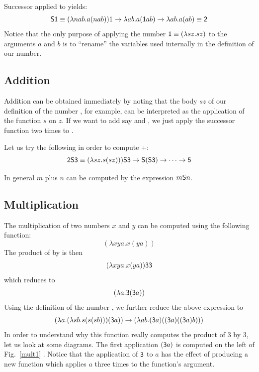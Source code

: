 \documentclass[12pt]{article}
\begin{document}
Successor applied to {} yields:
$${\sf S}{\sf 1}\equiv (\lambda nab.a(nab)){\sf 1} \rightarrow \lambda ab.a ({\sf 1}ab) \rightarrow \lambda ab.a(ab)\equiv {\sf 2}$$
Notice that the only purpose of applying the number ${\sf 1}\equiv(\lambda sz.sz)$ to the arguments $a$ and $b$ is to ``rename'' the variables used internally in the definition of our number.

\subsection{Addition}
Addition can be obtained immediately by noting that the body $sz$ of our definition of the number {}, for example, can be interpreted as the application of the function $s$ on $z$. If we want to add say {} and {}, we just apply the successor function two times to {}. 

Let us try the following in order to compute {}+{}:
$${\sf 2}{\sf S}{\sf 3}\equiv (\lambda sz.s(sz))){\sf S}{\sf 3}\rightarrow {\sf S}({\sf S}{\sf 3})\rightarrow \cdots \rightarrow {\sf 5}$$

In general $m$ plus $n$ can be computed by the expression $m{\sf S}n$.


\subsection{Multiplication}
The multiplication of two numbers $x$ and $y$ can be computed using the following function:
$$(\lambda xya.x(ya))$$ The product of {} by {} is then
$$(\lambda xya.x(ya)){\sf 3}{\sf 3}$$ which reduces to $$(\lambda a.{\sf 3}({\sf 3}a))$$
Using the definition of the number {}, we further reduce the above expression to
$$
(\lambda a.(\lambda sb.s(s(sb)))({\sf 3}a)) \rightarrow (\lambda ab. ({\sf 3}a)(({\sf 3}a)(({\sf 3}a)b)))
$$
In order to understand why this function really computes the product of 3 by 3, let us look at some diagrams. The first application 
$({\sf 3}a)$ is computed on the left of  Fig.~\ref{mult1} . Notice that the application of ${\sf 3}$ to $a$ has the effect of producing a new
function which applies $a$ three times to the function's argument.
\end{document}
